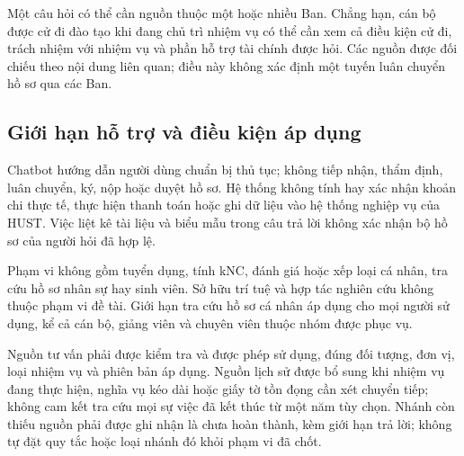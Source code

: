 Một câu hỏi có thể cần nguồn thuộc một hoặc nhiều Ban. Chẳng hạn, cán bộ
được cử đi đào tạo khi đang chủ trì nhiệm vụ có thể cần xem cả điều kiện
cử đi, trách nhiệm với nhiệm vụ và phần hỗ trợ tài chính được hỏi. Các
nguồn được đối chiếu theo nội dung liên quan; điều này không xác định một
tuyến luân chuyển hồ sơ qua các Ban.

\subsection{Giới hạn hỗ trợ và điều kiện áp dụng}
Chatbot hướng dẫn người dùng chuẩn bị thủ tục; không tiếp nhận, thẩm định,
luân chuyển, ký, nộp hoặc duyệt hồ sơ. Hệ thống không tính hay xác nhận
khoản chi thực tế, thực hiện thanh toán hoặc ghi dữ liệu vào hệ thống
nghiệp vụ của HUST. Việc liệt kê tài liệu và biểu mẫu trong câu trả lời
không xác nhận bộ hồ sơ của người hỏi đã hợp lệ.

Phạm vi không gồm tuyển dụng, tính kNC, đánh giá hoặc xếp loại cá nhân,
tra cứu hồ sơ nhân sự hay sinh viên. Sở hữu trí tuệ và hợp tác nghiên cứu
không thuộc phạm vi đề tài.
Giới hạn tra cứu hồ sơ cá nhân áp dụng cho mọi người sử dụng, kể cả cán
bộ, giảng viên và chuyên viên thuộc nhóm được phục vụ.

Nguồn tư vấn phải được kiểm tra và được phép sử dụng, đúng đối tượng, đơn
vị, loại nhiệm vụ và phiên bản áp dụng. Nguồn lịch sử được bổ sung khi nhiệm
vụ đang thực hiện, nghĩa vụ kéo dài hoặc giấy tờ tồn đọng cần xét chuyển
tiếp; không cam kết tra cứu mọi sự việc đã kết thúc từ một năm tùy chọn.
Nhánh còn thiếu nguồn phải được ghi nhận là chưa hoàn thành, kèm giới hạn
trả lời; không tự đặt quy tắc hoặc loại nhánh đó khỏi phạm vi đã chốt.

\clearpage
